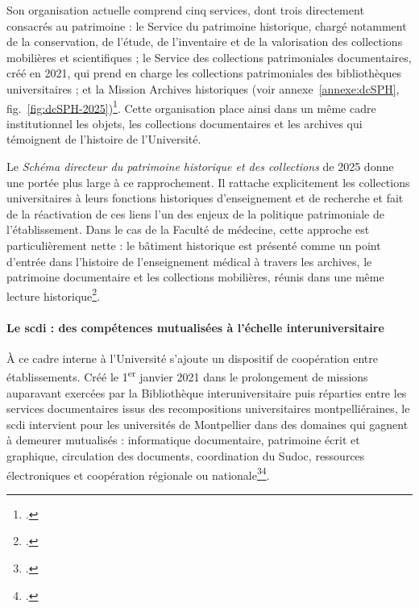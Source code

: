 Son organisation actuelle comprend cinq services, dont trois directement consacrés au patrimoine : le Service du patrimoine historique, chargé notamment de la conservation, de l'étude, de l'inventaire et de la valorisation des collections mobilières et scientifiques ; le Service des collections patrimoniales documentaires, créé en 2021, qui prend en charge les collections patrimoniales des bibliothèques universitaires ; et la Mission Archives historiques (voir annexe~\ref{annexe:dcSPH}, fig.~\ref{fig:dcSPH-2025})\footcite{UMSchemaDirecteurPatrimoine2025}. Cette organisation place ainsi dans un même cadre institutionnel les objets, les collections documentaires et les archives qui témoignent de l'histoire de l'Université.

Le \emph{Schéma directeur du patrimoine historique et des collections} de 2025 donne une portée plus large à ce rapprochement. Il rattache explicitement les collections universitaires à leurs fonctions historiques d'enseignement et de recherche et fait de la réactivation de ces liens l'un des enjeux de la politique patrimoniale de l'établissement. Dans le cas de la Faculté de médecine, cette approche est particulièrement nette : le bâtiment historique est présenté comme un point d'entrée dans l'histoire de l'enseignement médical à travers les archives, le patrimoine documentaire et les collections mobilières, réunis dans une même lecture historique\footcite{UMSchemaDirecteurPatrimoine2025}.

\paragraph{Le \gls{scdi} : des compétences mutualisées à l'échelle interuniversitaire}

À ce cadre interne à l'Université s'ajoute un dispositif de coopération entre établissements. Créé le 1\textsuperscript{er} janvier 2021 dans le prolongement de missions auparavant exercées par la Bibliothèque interuniversitaire puis réparties entre les services documentaires issus des recompositions universitaires montpelliéraines, le \gls{scdi} intervient pour les universités de Montpellier dans des domaines qui gagnent à demeurer mutualisés : informatique documentaire, patrimoine écrit et graphique, circulation des documents, coordination du Sudoc, ressources électroniques et coopération régionale ou nationale\footcite{LorblanchetArabesques111}\footcite{SCDI2022}.


